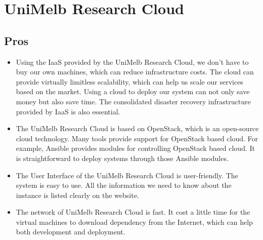 \documentclass{article}
\begin{document}
\clearpage
\section{UniMelb Research Cloud}
\subsection{Pros}
\begin{itemize}
	\item Using the IaaS provided by the UniMelb Research Cloud, we don't have to buy our own machines, which can reduce infrastructure costs. The cloud can provide virtually limitless scalability, which can help us scale our services based on the market. Using a cloud to deploy our system can not only save money but also save time. The consolidated disaster recovery infrastructure provided by IaaS is also essential.
	\item The UniMelb Research Cloud is based on OpenStack, which is an open-source cloud technology. Many tools provide support for OpenStack based cloud. For example, Ansible provides modules for controlling OpenStack based cloud. It is straightforward to deploy systems through those Ansible modules.
	\item The User Interface of the UniMelb Research Cloud is user-friendly. The system is easy to use. All the information we need to know about the instance is listed clearly on the website.
	\item The network of UniMelb Research Cloud is fast. It cost a little time for the virtual machines to download dependency from the Internet, which can help both development and deployment.
\end{itemize}
\end{document}
